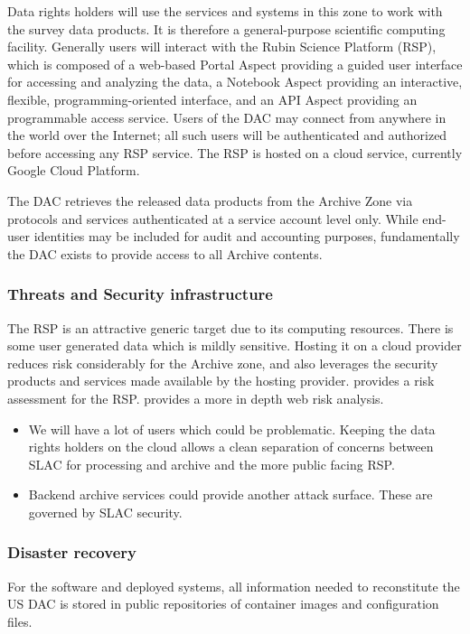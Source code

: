 Data rights holders will use the services and systems in this zone to work with the survey data products.
It is therefore a general-purpose scientific computing facility. Generally users will interact with the Rubin \gls{Science Platform} (\gls{RSP}), which is composed of a web-based Portal Aspect providing a guided user interface for accessing and analyzing the data, a Notebook Aspect providing an interactive, flexible, programming-oriented interface, and an API Aspect providing an programmable access service.
Users of the DAC may connect from anywhere in the world over the Internet; all such users will be authenticated and authorized before accessing any \gls{RSP} service.
The \gls{RSP} is hosted on a \gls{cloud} service, currently  Google Cloud Platform.

The DAC retrieves the released data products from the \gls{Archive} Zone via protocols and services authenticated at a service account level only. While end-user identities may be included for audit and accounting purposes, fundamentally the DAC exists to provide access to all \gls{Archive} contents.

\subsubsection{ Threats and Security infrastructure}
The \gls{RSP} is  an attractive generic target due to its computing resources.
There is some user generated data which is mildly sensitive.
Hosting it on a cloud provider reduces risk considerably for the \gls{Archive} zone, and also leverages the security products and services made available by the hosting provider.
 provides a risk assessment for the \gls{RSP}.
 provides a more in depth web risk analysis.

\begin{itemize}
\item We will have a lot of users which could be problematic. Keeping the data rights holders on the \gls{cloud} allows a clean separation of concerns between SLAC for processing and archive and the more public facing \gls{RSP}.

\item Backend archive services could provide another attack surface.  These are governed by \gls{SLAC} security.
\end{itemize}

\subsubsection{Disaster recovery}
For the software and deployed systems, all information needed to reconstitute the US DAC is stored in public repositories of container images and configuration files.

